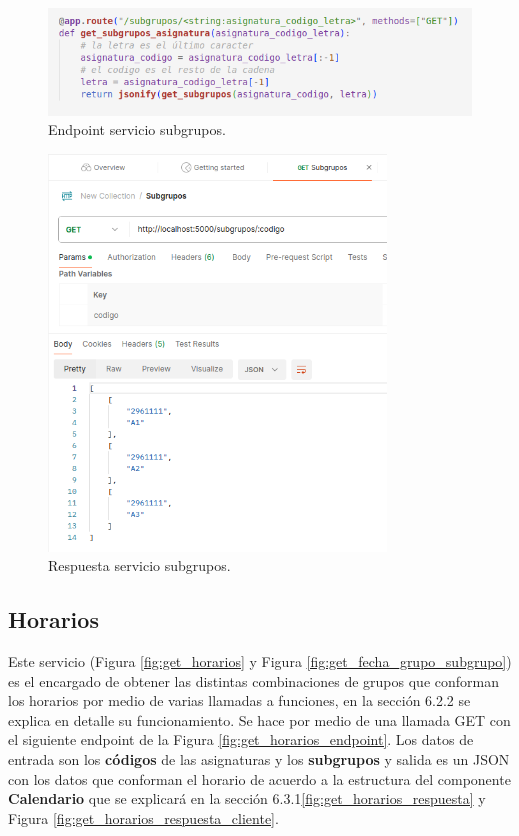 \begin{figure}[H]
    \centering
    \includegraphics[width=1\textwidth]{./imagenes/get_subgrupos_endpoint.png}
    \caption{Endpoint servicio subgrupos.}
    \label{fig:get_subgrupos_endpoint}
\end{figure}

\begin{figure}[H]
    \centering
    \includegraphics[width=0.8\textwidth]{./imagenes/get_subgrupos_respuesta.png}
    \caption{Respuesta servicio subgrupos.}
    \label{fig:get_subgrupos_respuesta}
\end{figure}

\subsection*{Horarios}

Este servicio (Figura \ref{fig:get_horarios} y Figura \ref{fig:get_fecha_grupo_subgrupo}) es el encargado de obtener las distintas combinaciones de grupos que conforman los horarios por medio de varias llamadas a funciones, en la sección 6.2.2 se explica en detalle su funcionamiento. Se hace por medio de una llamada GET con el siguiente endpoint de la Figura \ref{fig:get_horarios_endpoint}. Los datos de entrada son los \textbf{códigos} de las asignaturas y los \textbf{subgrupos} y salida es un JSON con los datos que conforman el horario de acuerdo a la estructura del componente \textbf{Calendario} que se explicará en la sección 6.3.1\ref{fig:get_horarios_respuesta} y Figura \ref{fig:get_horarios_respuesta_cliente}.

